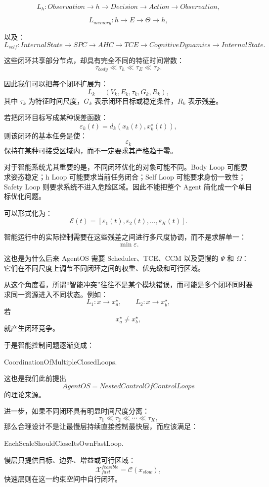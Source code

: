 \[
L_h:
Observation
\rightarrow
h
\rightarrow
Decision
\rightarrow
Action
\rightarrow
Observation,
\]

\[
L_{memory}:
h
\rightarrow
E
\rightarrow
\Theta
\rightarrow
h,
\]

以及：
\[
L_{self}:
InternalState
\rightarrow
SPC
\rightarrow
AHC
\rightarrow
TCE
\rightarrow
CognitiveDynamics
\rightarrow
InternalState.
\]

这些闭环共享部分节点，却具有完全不同的特征时间常数：
\[
\tau_{body}
\ll
\tau_h
\ll
\tau_E
\ll
\tau_\Psi.
\]

因此我们可以把每个闭环扩展为：
\[
L_k
=
\left(
V_k,
E_k,
\tau_k,
G_k,
R_k
\right),
\]
其中 $\tau_k$ 为特征时间尺度，$G_k$ 表示闭环目标或稳定条件，$R_k$ 表示残差。

若把闭环目标写成某种误差函数：
\[
\varepsilon_k(t)
=
d_k
\left(
x_k(t),
x_k^\star(t)
\right),
\]
则该闭环的基本任务是使：
\[
\varepsilon_k
\]
保持在某种可接受区域内，而不一定要求其严格趋于零。

对于智能系统尤其重要的是，不同闭环优化的对象可能不同。Body Loop 可能要求姿态稳定；h Loop 可能要求当前任务闭合；Self Loop 可能要求身份一致性；Safety Loop 则要求系统不进入危险区域。因此不能把整个 Agent 简化成一个单目标优化问题。

可以形式化为：
\[
\mathcal E(t)
=
\left[
\varepsilon_1(t),
\varepsilon_2(t),
\ldots,
\varepsilon_K(t)
\right].
\]

智能运行中的实际控制需要在这些残差之间进行多尺度协调，而不是求解单一：
\[
\min \varepsilon.
\]

这也是为什么后来 AgentOS 需要 Scheduler、TCE、CCM 以及更慢的 $\Psi$ 和 $\Omega$：它们在不同尺度上调节不同闭环之间的权重、优先级和可行区域。

从这个角度看，所谓“智能冲突”往往不是某个模块错误，而可能是多个闭环同时要求同一资源进入不同状态。例如：
\[
L_1:x\rightarrow x_a^\star,
\qquad
L_2:x\rightarrow x_b^\star,
\]
若
\[
x_a^\star\neq x_b^\star,
\]
就产生闭环竞争。

于是智能控制问题逐渐变成：
\begin{statementbox}
CoordinationOfMultipleClosedLoops.
\end{statementbox}

这也是我们此前提出
\[
AgentOS=NestedControlOfControlLoops
\]
的理论来源。

进一步，如果不同闭环具有明显时间尺度分离：
\[
\tau_1\ll\tau_2\ll\cdots\ll\tau_K,
\]
那么合理设计不是让最慢层持续直接控制最快层，而应该满足：
\begin{statementbox}
EachScaleShouldCloseItsOwnFastLoop.
\end{statementbox}
慢层只提供目标、边界、增益或可行区域：
\[
\mathcal X_{fast}^{feasible}
=
\mathcal C(x_{slow}),
\]
快速层则在这一约束空间中自行闭环。

